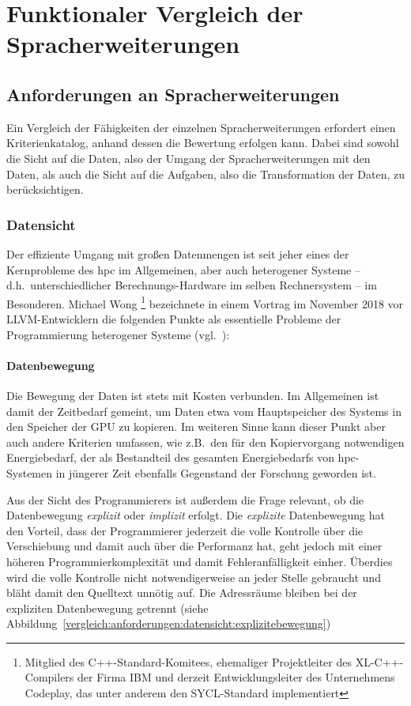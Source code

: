 \section{Funktionaler Vergleich der Spracherweiterungen}
\label{vergleich}

\subsection{Anforderungen an Spracherweiterungen}
\label{vergleich:anforderungen}

Ein Vergleich der Fähigkeiten der einzelnen Spracherweiterungen erfordert einen
Kriterienkatalog, anhand dessen die Bewertung erfolgen kann. Dabei sind sowohl
die Sicht auf die Daten, also der Umgang der Spracherweiterungen mit den Daten,
als auch die Sicht auf die Aufgaben, also die Transformation der Daten, zu
berücksichtigen.

\subsubsection{Datensicht}
\label{vergleich:anforderungen:datensicht}

Der effiziente Umgang mit großen Datenmengen ist seit jeher eines der
Kernprobleme des \gls{hpc} im Allgemeinen, aber auch heterogener Systeme --
d.h.\ unterschiedlicher Berechnungs-Hardware im selben Rechnersystem -- im
Besonderen. Michael Wong \footnote{Mitglied des C++-Standard-Komitees,
ehemaliger Projektleiter des XL-C++-Compilers der Firma IBM und derzeit
Entwicklungsleiter des Unternehmens Codeplay, das unter anderem den
SYCL-Standard implementiert} bezeichnete in einem Vortrag im November 2018 vor
LLVM-Entwicklern die folgenden Punkte als essentielle Probleme der
Programmierung heterogener Systeme (vgl.~\cite{wong2018}):

\paragraph{Datenbewegung} 
Die Bewegung der Daten ist stets mit Kosten verbunden. Im Allgemeinen ist damit
der Zeitbedarf gemeint, um Daten etwa vom Hauptspeicher des Systems in den
Speicher der GPU zu kopieren. Im weiteren Sinne kann dieser Punkt aber auch
andere Kriterien umfassen, wie z.B.\ den für den Kopiervorgang notwendigen
Energiebedarf, der als Bestandteil des gesamten Energiebedarfs von
\gls{hpc}-Systemen in jüngerer Zeit ebenfalls Gegenstand der Forschung geworden
ist.

Aus der Sicht des Programmierers ist außerdem die Frage relevant, ob die
Datenbewegung \textit{explizit} oder \textit{implizit} erfolgt. Die
\textit{explizite} Datenbewegung hat den Vorteil, dass der Programmierer
jederzeit die volle Kontrolle über die Verschiebung und damit auch über die
Performanz hat, geht jedoch mit einer höheren Programmierkomplexität und damit
Fehleranfälligkeit einher. Überdies wird die volle Kontrolle nicht
notwendigerweise an jeder Stelle gebraucht und bläht damit den Quelltext unnötig
auf. Die Adressräume bleiben bei der expliziten Datenbewegung getrennt (siehe
Abbildung~\ref{vergleich:anforderungen:datensicht:explizitebewegung})

